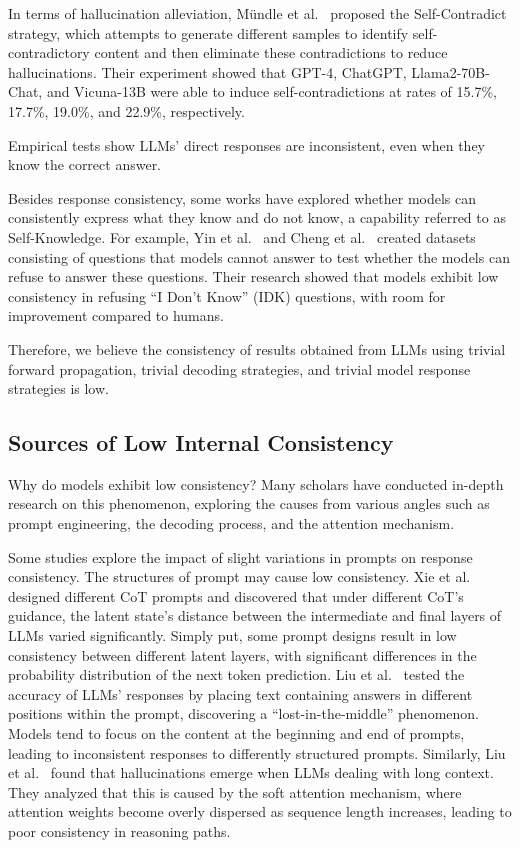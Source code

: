 \documentclass[lettersize,journal]{IEEEtran}
\begin{document}
In terms of hallucination alleviation, M\"undle et al.~\cite{HalluSelfContradictory_24_ICLR_ETH} proposed the Self-Contradict strategy, which attempts to generate different samples to identify self-contradictory content and then eliminate these contradictions to reduce hallucinations. Their experiment showed that GPT-4, ChatGPT, Llama2-70B-Chat, and Vicuna-13B were able to induce self-contradictions at rates of 15.7\%, 17.7\%, 19.0\%, and 22.9\%, respectively.

Empirical tests show LLMs’ direct responses are inconsistent, even when they know the correct answer.

Besides response consistency, some works have explored whether models can consistently express what they know and do not know, a capability referred to as Self-Knowledge. For example, Yin et al.~\cite{TheoryKnowUnknown_23_ACL_Fudan} and Cheng et al.~\cite{TheoryKnowUnknown_24_arxiv_Fudan} created datasets consisting of questions that models cannot answer to test whether the models can refuse to answer these questions. Their research showed that models exhibit low consistency in refusing ``I Don't Know'' (IDK) questions, with room for improvement compared to humans.

Therefore, we believe the consistency of results obtained from LLMs using trivial forward propagation, trivial decoding strategies, and trivial model response strategies is low.


\subsection{Sources of Low Internal Consistency}  \label{sec:sources_of_low}


\noindent Why do models exhibit low consistency? Many scholars have conducted in-depth research on this phenomenon, exploring the causes from various angles such as prompt engineering, the decoding process, and the attention mechanism.

Some studies explore the impact of slight variations in prompts on response consistency. The structures of prompt may cause low consistency. Xie et al.~\cite{CalibIC_24_arXiv_SJTU} designed different CoT prompts and discovered that under different CoT's guidance, the latent state's distance between the intermediate and final layers of LLMs varied significantly. Simply put, some prompt designs result in low consistency between different latent layers, with significant differences in the probability distribution of the next token prediction. Liu et al.~\cite{LiTM_24_TACL_Stanford} tested the accuracy of LLMs' responses by placing text containing answers in different positions within the prompt, discovering a ``lost-in-the-middle'' phenomenon. Models tend to focus on the content at the beginning and end of prompts, leading to inconsistent responses to differently structured prompts. Similarly, Liu et al.~\cite{FFLM_23_NIPS_CMU} found that hallucinations emerge when LLMs dealing with long context. They analyzed that this is caused by the soft attention mechanism, where attention weights become overly dispersed as sequence length increases, leading to poor consistency in reasoning paths.
\end{document}
